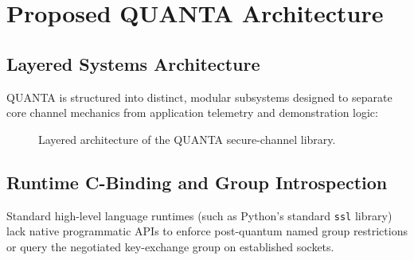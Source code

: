 \documentclass[conference]{IEEEtran}
\begin{document}
\section{Proposed QUANTA Architecture}

\subsection{Layered Systems Architecture}
QUANTA is structured into distinct, modular subsystems designed to separate core channel mechanics from application telemetry and demonstration logic:

\begin{figure}[htbp]
\centering
{}
\caption{Layered architecture of the QUANTA secure-channel library.}
\label{fig:arch}
\end{figure}

\subsection{Runtime C-Binding and Group Introspection}
Standard high-level language runtimes (such as Python's standard \texttt{ssl} library) lack native programmatic APIs to enforce post-quantum named group restrictions or query the negotiated key-exchange group on established sockets.
\end{document}
